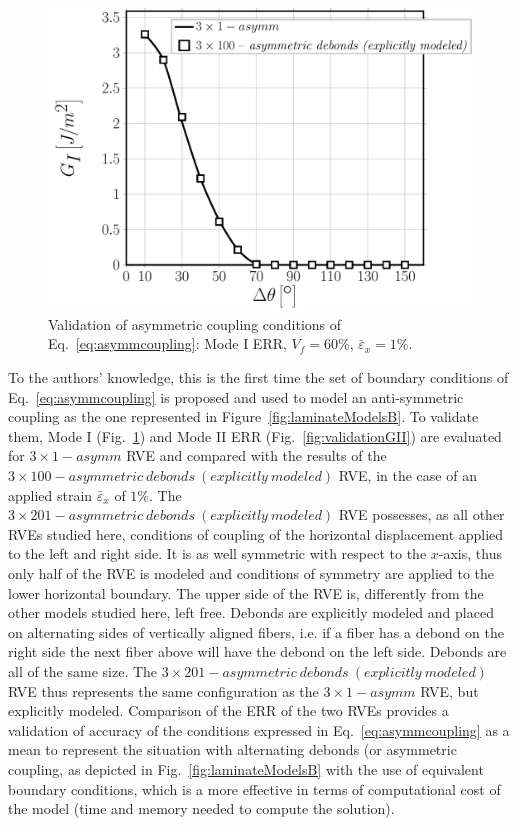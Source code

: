 \documentclass[smallextended]{svjour3}       %
\begin{document}
\begin{figure}[!h]
\centering
\includegraphics[width=\textwidth]{asymm-vs-explmodel-vf60-GI.pdf}
\caption{Validation of asymmetric coupling conditions of Eq.~\ref{eq:asymmcoupling}: Mode I ERR, $V_{f}=60\%$, $\bar{\varepsilon}_{x}=1\%$.}\label{fig:validationGI}
\end{figure}

To the authors' knowledge, this is the first time the set of boundary conditions of Eq.~\ref{eq:asymmcoupling} is proposed and used to model an anti-symmetric coupling as the one represented in Figure~\ref{fig:laminateModelsB}. To validate them, Mode I (Fig.~\ref{fig:validationGI}) and Mode II ERR (Fig.~\ref{fig:validationGII}) are evaluated for $3\times 1-asymm$ RVE and compared with the results of the $3\times100-asymmetric\ debonds\ (explicitly\ modeled)$ RVE, in the case of an applied strain $\bar{\varepsilon}_{x}$ of $1\%$. The $3\times201-asymmetric\ debonds\ (explicitly\ modeled)$ RVE possesses, as all other RVEs studied here, conditions of coupling of the horizontal displacement applied to the left and right side. It is as well symmetric with respect to the $x$-axis, thus only half of the RVE is modeled and conditions of symmetry are applied to the lower horizontal boundary. The upper side of the RVE is, differently from the other models studied here, left free. Debonds are explicitly modeled and placed on alternating sides of vertically aligned fibers, i.e. if a fiber has a debond on the right side the next fiber above will have the debond on the left side. Debonds are all of the same size. The $3\times201-asymmetric\ debonds\ (explicitly\ modeled)$ RVE thus represents the same configuration as the $3\times 1-asymm$ RVE, but explicitly modeled. Comparison of the ERR of the two RVEs provides a validation of accuracy of the conditions expressed in Eq.~\ref{eq:asymmcoupling} as a mean to represent the situation with alternating debonds (or asymmetric coupling, as depicted in Fig.~\ref{fig:laminateModelsB} with the use of equivalent boundary conditions, which is a more effective in terms of computational cost of the model (time and memory needed to compute the solution).
\end{document}
